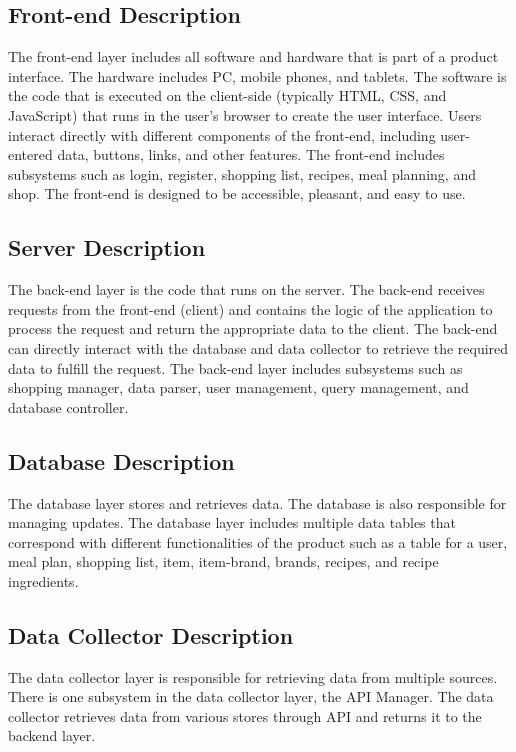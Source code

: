 \subsection{Front-end Description}
The front-end layer includes all software and hardware that is part of a product interface. The hardware includes PC, mobile phones, and tablets. The software is the code that is executed on the client-side (typically HTML, CSS, and JavaScript) that runs in the user's browser to create the user interface. Users interact directly with different components of the front-end, including user-entered data, buttons, links, and other features. The front-end includes subsystems such as login, register, shopping list, recipes, meal planning, and shop. The front-end is designed to be accessible, pleasant, and easy to use.

\subsection{Server Description}
The back-end layer is the code that runs on the server. The back-end receives requests from the front-end (client) and contains the logic of the application to process the request and return the appropriate data to the client. The back-end can directly interact with the database and data collector to retrieve the required data to fulfill the request. The back-end layer includes subsystems such as shopping manager, data parser, user management, query management, and database controller.

\subsection{Database Description}
The database layer stores and retrieves data. The database is also responsible for managing updates. The database layer includes multiple data tables that correspond with different functionalities of the product such as a table for a user, meal plan, shopping list, item, item-brand, brands, recipes, and recipe ingredients.

\subsection{Data Collector Description}
The data collector layer is responsible for retrieving data from multiple sources. There is one subsystem in the data collector layer, the API Manager. The data collector retrieves data from various stores through API and returns it to the backend layer.

